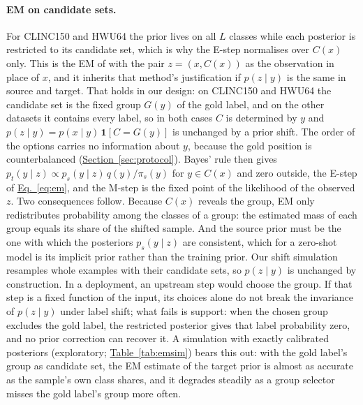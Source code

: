 \paragraph{EM on candidate sets.}
For CLINC150 and HWU64 the prior lives on all $L$ classes while each posterior is restricted to its candidate set, which
is why the E-step normalises over $C(x)$ only. This is the EM of \citet{saerens2002adjusting} with the pair
$z=(x,C(x))$ as the observation in place of $x$, and it inherits that method's justification if $p(z\mid y)$ is the
same in source and target. That holds in our design: on CLINC150 and HWU64 the candidate set is the fixed group $G(y)$
of the gold label, and on the other datasets it contains every label, so in both cases $C$ is determined by $y$ and
$p(z\mid y)=p(x\mid y)\,\mathbf{1}[C=G(y)]$ is unchanged by a prior shift. The order of the options carries no
information about $y$, because the gold position is counterbalanced (\hyperref[sec:protocol]{Section~\ref*{sec:protocol}}).
Bayes' rule then gives $p_t(y\mid z)\propto p_s(y\mid z)\,q(y)/\pi_s(y)$ for $y\in C(x)$ and zero outside, the E-step of
\hyperref[eq:em]{Eq.~\ref*{eq:em}}, and the M-step is the fixed point of the likelihood of the observed $z$. Two
consequences follow. Because $C(x)$ reveals the group, EM only redistributes probability among the classes of a group:
the estimated mass of each group equals its share of the shifted sample. And the source prior must be the one with which
the posteriors $p_s(y\mid z)$ are consistent, which for a zero-shot model is its implicit prior rather than the training
prior. Our shift simulation resamples whole examples with their candidate sets, so $p(z\mid y)$ is unchanged by
construction. In a deployment, an upstream step would choose the group. If that step is a fixed function of the input,
its choices alone do not break the invariance of $p(z\mid y)$ under label shift; what fails is support: when the chosen
group excludes the gold label, the restricted posterior gives that label probability zero, and no prior correction can
recover it. A simulation with exactly calibrated posteriors (exploratory; \hyperref[tab:emsim]{Table~\ref*{tab:emsim}})
bears this out: with the gold label's group as candidate set, the EM estimate of the target prior is almost as accurate
as the sample's own class shares, and it degrades steadily as a group selector misses the gold label's group more
often.

